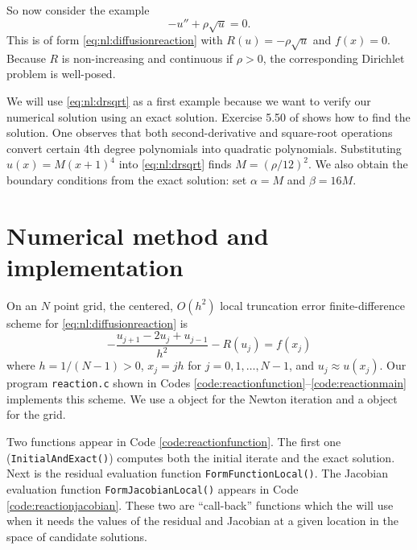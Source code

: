So now consider the example
\begin{equation}
-u'' + \rho \sqrt{u} = 0. \label{eq:nl:drsqrt}
\end{equation}
This is of form \eqref{eq:nl:diffusionreaction} with $R(u) = - \rho \sqrt{u}$ and $f(x)=0$.  Because $R$ is non-increasing and continuous if $\rho>0$, the corresponding Dirichlet problem is well-posed.

We will use \eqref{eq:nl:drsqrt} as a first example because we want to verify our numerical solution using an exact solution.   Exercise 5.50 of \citet[page 240]{Ockendonetal2003} shows how to find the solution.  One observes that both second-derivative and square-root operations convert certain 4th degree polynomials into quadratic polynomials.  Substituting $u(x)=M(x+1)^4$ into \eqref{eq:nl:drsqrt} finds $M=(\rho/12)^2$.  We also obtain the boundary conditions from the exact solution: set $\alpha=M$ and $\beta=16 M$.


\section{Numerical method and implementation} \label{sec:nl:implementation}

On an $N$ point grid, the centered, $O(h^2)$ local truncation error \citep{MortonMayers2005} finite-difference scheme for \eqref{eq:nl:diffusionreaction} is
\begin{equation}
- \frac{u_{j+1} - 2 u_j + u_{j-1}}{h^2} - R(u_j) = f(x_j)   \label{eq:nl:drfdscheme}
\end{equation}
where $h=1/(N-1)>0$, $x_j = j h$ for $j=0,1,\dots,N-1$, and $u_j \approx u(x_j)$.  Our program \texttt{reaction.c} shown in Codes \ref{code:reactionfunction}--\ref{code:reactionmain} implements this scheme.  We use a \pSNES object for the Newton iteration and a \pDMDA object for the grid.


Two functions appear in Code \ref{code:reactionfunction}.  The first one (\texttt{InitialAndExact()}) computes both the initial iterate and the exact solution.  Next is the residual evaluation function \texttt{FormFunctionLocal()}.  The Jacobian evaluation function \texttt{FormJacobianLocal()} appears in Code \ref{code:reactionjacobian}.  These two are ``call-back'' functions which the \pSNES will use when it needs the values of the residual and Jacobian at a given location in the space of candidate solutions.

